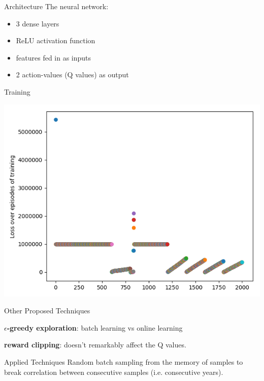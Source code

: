 \documentclass{beamer}
\begin{document}
\begin{frame}{Architecture}
    The neural network:
    \begin{itemize}
        \item 3 dense layers
        \item ReLU activation function
        \item features fed in as inputs
        \item 2 action-values (Q values) as output
    \end{itemize}
    
\end{frame}

\begin{frame}{Training}

\includegraphics[scale=0.35]{myplot.png}

    
\end{frame}

  
\begin{frame}{Other Proposed Techniques}
    \item \textbf{$\epsilon$-greedy exploration}: batch learning vs online learning
    \item \textbf{reward clipping}: doesn't remarkably affect the Q values.
\end{frame}
  
  
\begin{frame}{Applied Techniques}
Random batch sampling from the memory of samples to break correlation between consecutive samples (i.e. consecutive years).

\end{frame}
\end{document}
